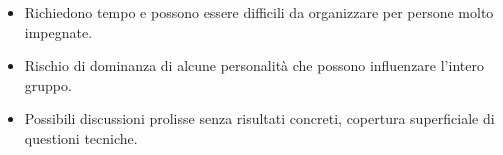 \begin{tcolorbox}[colback=red!5!white,colframe=red!75!black, title=Svantaggi delle sessioni
    di gruppo]
    \begin{itemize}
        \item Richiedono tempo e possono essere difficili da organizzare per persone molto
        impegnate.
        \item Rischio di dominanza di alcune personalità che possono influenzare l'intero
        gruppo.
        \item Possibili discussioni prolisse senza risultati concreti, copertura
        superficiale di questioni tecniche.
    \end{itemize}
\end{tcolorbox}